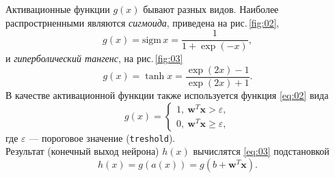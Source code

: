 \documentclass[12pt,a4paper]{article}
\newcommand*{\SavedEqref}{}
\let\SavedEqref\eqref
\renewcommand*{\eqref}[1]{%
	\begingroup
	\hypersetup{
		linkcolor=linkequation,
		linkbordercolor=linkequation,
	}%
	\SavedEqref{#1}%
	\endgroup
}
\renewcommand{\v}{\mathbf}
\begin{document}
Активационные функции $g(x)$ бывают разных видов. 
Наиболее распрострненными являются 
\emph{сигмоида}, приведена на рис.\,\ref{fig:02},
\begin{equation}\label{eq:04}
g(x) = \mathrm{sigm}{\,x} = \dfrac{1}{1+\exp{(-x)}},
\end{equation}
и \emph{гиперболический тангенс}, на рис.\,\ref{fig:03}
\begin{equation}\label{eq:05}
g(x) = \tanh{x} = \dfrac{\exp(2x)-1}{\exp{(2x)}+1}.
\end{equation}
В качестве активационной функции также используется функция \eqref{eq:02} вида
\begin{equation}\label{eq:02}
g(x) = 
\begin{cases}
1,~\v{w}^T\v{x}>\varepsilon,\\
0,~\v{w}^T\v{x}\geqslant\varepsilon,
\end{cases}
\end{equation}
где $\varepsilon$ --- пороговое значение (\texttt{treshold}).\\

Результат (конечный выход нейрона) $h(x)$ вычислятся \eqref{eq:03} подстановкой 
\begin{equation}\label{eq:03}
h(x) = g(a(x)) = g(b + \v{w}^T\v{x}).
\end{equation}
\end{document}
